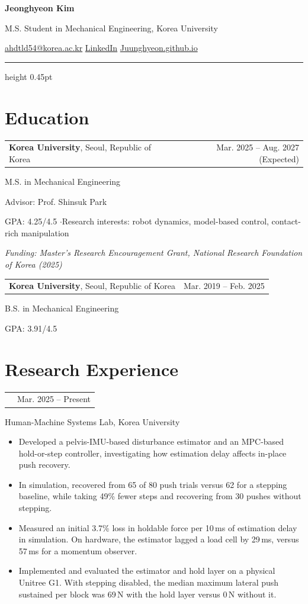\documentclass[letterpaper,10pt]{article}
\makeatletter
\newcommand{\datedline}[2]{%
  \par\noindent
  \begin{tabularx}{\linewidth}{@{}>{\raggedright\arraybackslash}X@{\hspace{1em}}r@{}}
    #1 & {\small #2}
  \end{tabularx}\par\nopagebreak
}
\newcommand{\entry}[4]{%
  \datedline{\textbf{#1}, #3}{#4}%
  #2\par\nopagebreak
}
\newcommand{\project}[2]{\datedline{{\fontsize{10.5}{12}\selectfont\bfseries #1}}{#2}}
\newcommand{\researchentry}[2]{%
  \project{#1}{#2}%
  Human-Machine Systems Lab, Korea University\par\nopagebreak
}
\newcommand{\detail}[1]{#1\par}
\newcommand{\note}[1]{{\small\itshape #1\par}\smallskip}
\newcommand{\compactlist}{%
  \begin{itemize}[leftmargin=1.55em,itemsep=0.4pt,topsep=2pt,parsep=0pt,partopsep=0pt]
}
\newcommand{\finishcompactlist}{\end{itemize}\addvspace{5pt}}
\newcommand{\contactseparator}{\enspace\textbar\enspace}
\makeatother
\begin{document}
{\centering
  {\fontsize{33}{37}\selectfont\bfseries Jeonghyeon Kim\par}
  \vspace{3pt}
  {\small M.S. Student in Mechanical Engineering, Korea University\par}
  \vspace{2pt}
  {\small
    \href{mailto:ahdtld54@korea.ac.kr}{ahdtld54@korea.ac.kr}
    \contactseparator
    \href{https://www.linkedin.com/in/\%EC\%A0\%95\%ED\%98\%84-\%EA\%B9\%80-b2a0b8263/}{LinkedIn}
    \contactseparator
    \href{https://Juunghyeon.github.io}{Juunghyeon.github.io}\par
  }
}
\vspace{7pt}
{\color{ruleblue}\hrule height 0.45pt}


\section{Education}

\entry{Korea University}{M.S. in Mechanical Engineering}{Seoul, Republic of Korea}{Mar. 2025 -- Aug. 2027 (Expected)}
\detail{Advisor: Prof. Shinsuk Park}
\detail{GPA: 4.25/4.5 \enspace$\cdot$\enspace Research interests: robot dynamics, model-based control, contact-rich manipulation}
\note{Funding: Master's Research Encouragement Grant, National Research Foundation of Korea (2025)}

\entry{Korea University}{B.S. in Mechanical Engineering}{Seoul, Republic of Korea}{Mar. 2019 -- Feb. 2025}
\detail{GPA: 3.91/4.5}

\section{Research Experience}

\researchentry{Push Recovery for a Force-Sensorless Humanoid}{Mar. 2025 -- Present}
\compactlist
  \item Developed a pelvis-IMU-based disturbance estimator and an MPC-based hold-or-step controller, investigating how estimation delay affects in-place push recovery.
  \item In simulation, recovered from 65 of 80 push trials versus 62 for a stepping baseline, while taking 49\% fewer steps and recovering from 30 pushes without stepping.
  \item Measured an initial 3.7\% loss in holdable force per 10\,ms of estimation delay in simulation. On hardware, the estimator lagged a load cell by 29\,ms, versus 57\,ms for a momentum observer.
  \item Implemented and evaluated the estimator and hold layer on a physical Unitree G1. With stepping disabled, the median maximum lateral push sustained per block was 69\,N with the hold layer versus 0\,N without it.
\finishcompactlist
\end{document}
